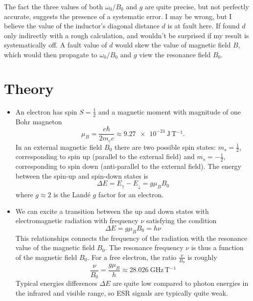 \documentclass[11pt, a4paper]{article}
\begin{document}
The fact the three values of both $ \omega_{0}/ B_{0}  $ and $ g $ are quite precise, but not perfectly accurate, suggests the presence of a systematic error. I may be wrong, but I believe the value of the inductor's diagonal distance $ d $ is at fault here. If found $ d $ only indirectly with a rough calculation, and wouldn't be surprised if my result is systematically off. A fault value of $ d $ would skew the value of magnetic field $ B $, which would then propagate to $ \omega_{0}/ B_{0}  $ and $ g $ view the resonance field $ B_{0} $. 


\appendix

\section{Theory} \label{elespinres:s:theory}
\begin{itemize}
	
	\item An electron has spin $ S = \frac{1}{2} $ and a magnetic moment with magnitude of one Bohr magneton
	\begin{equation*}
		\mu_{B} = \frac{e\hbar}{2m_{e}c} \approx \SI{9.27e-24}{\joule \, \tesla^{-1}}.
	\end{equation*}
	In an external magnetic field $ B_{0} $ there are two possible spin states: $ m_{s} = \frac{1}{2} $, corresponding to spin up (parallel to the external field) and $ m_{s} = -\frac{1}{2} $, corresponding to spin down (anti-parallel to the external field). The energy between the spin-up and spin-down states is
	\begin{equation*}
		\Delta E = E_{\uparrow} - E_{\downarrow} = g \mu_{B} B_{0}
	\end{equation*}
	where $ g \approx 2 $ is the Land\'{e} $ g $ factor for an electron.
	
	\item We can excite a transition between the up and down states with electromagnetic radiation with frequency $ \nu $ satisfying the condition
	\begin{equation*}
		\Delta E = g \mu_{B} B_{0} = h \nu
	\end{equation*}
	This relationships connects the frequency of the radiation with the resonance value of the magnetic field $ B_{0} $. The resonance frequency $ \nu $ is thus a function of the magnetic field $ B_{0} $. For a free electron, the ratio $ \frac{\nu}{B_{0}} $ is roughly
	\begin{equation*}
		\frac{\nu}{B_{0}} = \frac{g \mu_{B}}{h} \approx \SI{28.026}{\giga \hertz \, \tesla^{-1}}
	\end{equation*}
	Typical energies differences $ \Delta E $ are quite low compared to photon energies in the infrared and visible range, so ESR signals are typically quite weak. 
	

\end{itemize}
\end{document}
